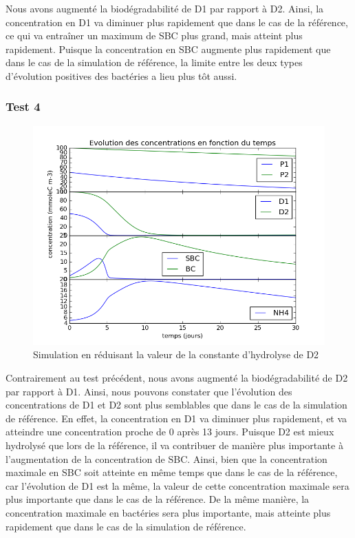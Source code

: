 \par{
Nous avons augment\'e la biod\'egradabilit\'e de D1 par rapport \`a D2. Ainsi, la concentration en D1 va diminuer plus rapidement que dans le cas de la r\'ef\'erence, ce qui va entra\^iner un maximum de SBC plus grand, mais atteint plus rapidement. Puisque la concentration en SBC augmente plus rapidement que dans le cas de la simulation de r\'ef\'erence, la limite entre les deux types d'\'evolution positives des bact\'eries a lieu plus t\^ot aussi.
}

\FloatBarrier
\newpage
\subsubsection{Test 4}

\par{
\begin{figure}[h!]
  \includegraphics[width=\textwidth]{partie2/Test4.png}
  \caption{Simulation en r\'eduisant la valeur de la constante d'hydrolyse de D2
  }
  \label{fig:partie2test4}
\end{figure}
}
\par{
Contrairement au test pr\'ec\'edent, nous avons augment\'e la biod\'egradabilit\'e de D2 par rapport \`a D1. Ainsi, nous pouvons constater que l'\'evolution des concentrations de D1 et D2 sont plus semblables que dans le cas de la simulation de r\'ef\'erence. En effet, la concentration en D1 va diminuer plus rapidement, et va atteindre une concentration proche de 0 apr\`es 13 jours. Puisque D2 est mieux hydrolys\'e que lors de la r\'ef\'erence, il va contribuer de mani\`ere plus importante \`a l'augmentation de la concentration de SBC. Ainsi, bien que la concentration maximale en SBC soit atteinte en m\^eme temps que dans le cas de la r\'ef\'erence, car l'\'evolution de D1 est la m\^eme, la valeur de cette concentration maximale sera plus importante que dans le cas de la r\'ef\'erence. De la m\^eme mani\`ere, la concentration maximale en bact\'eries sera plus importante, mais atteinte plus rapidement que dans le cas de la simulation de r\'ef\'erence.
}

